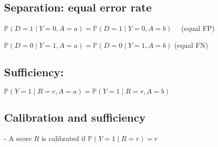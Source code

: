 





\subsection*{Separation: equal error rate}


$\mathbb{P}(D=1 \mid Y=0, A=a)=\mathbb{P}(D=1 \mid Y=0, A=b) \quad$ (equal FP)

$\mathbb{P}(D=0 \mid Y=1, A=a)=\mathbb{P}(D=0 \mid Y=1, A=b)$ (equal FN)



\subsection*{Sufficiency:}


$
\mathbb{P}(Y=1 \mid R=r, A=a)=\mathbb{P}(Y=1 \mid R=r, A=b)
$


\subsection*{Calibration and sufficiency}
- A score $R$ is calibrated if $
\mathbb{P}(Y=1 \mid R=r)=r
$



